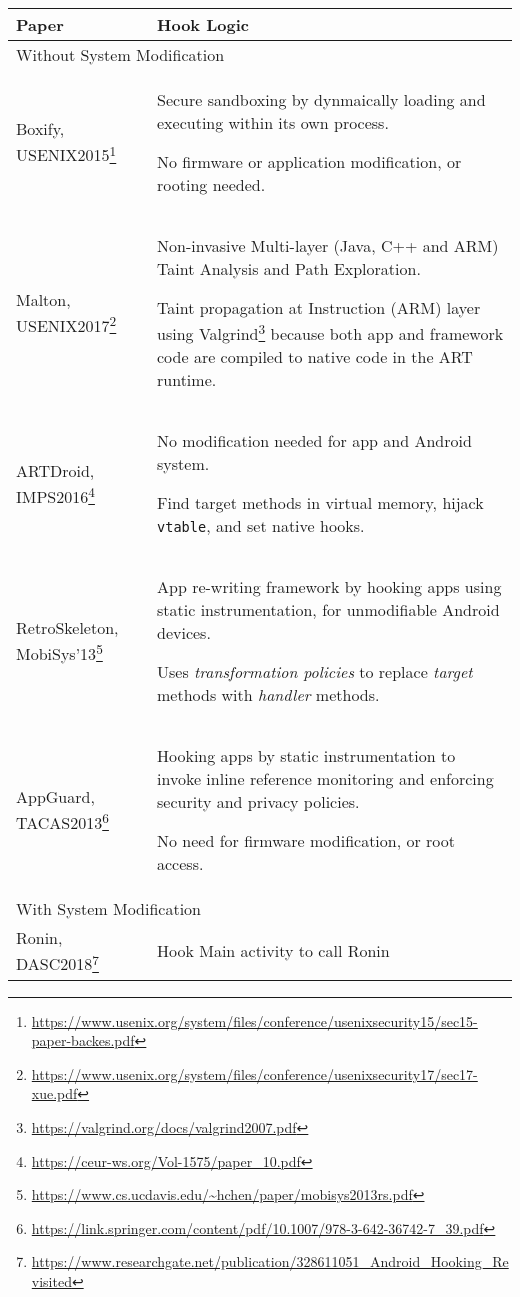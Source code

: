 \begin{longtable}{p{.3\linewidth}p{.7\linewidth}} 
\toprule
Paper & Hook Logic  \\
\midrule
\endhead
\multicolumn{2}{l}{Without System Modification}\\
\midrule

Boxify, USENIX2015\footnote{\url{https://www.usenix.org/system/files/conference/usenixsecurity15/sec15-paper-backes.pdf}}
& Secure sandboxing by dynmaically loading and executing within its own process.

No firmware or application modification, or rooting needed.
\\

Malton, USENIX2017\footnote{\url{https://www.usenix.org/system/files/conference/usenixsecurity17/sec17-xue.pdf}}
& Non-invasive Multi-layer (Java, C++ and ARM) Taint Analysis and Path Exploration. 

Taint propagation at Instruction (ARM) layer using Valgrind\footnote{\url{https://valgrind.org/docs/valgrind2007.pdf}} because both app and framework code are compiled to native code in the ART runtime.
\\

ARTDroid, IMPS2016\footnote{\url{https://ceur-ws.org/Vol-1575/paper_10.pdf}}
& No modification needed for app and Android system.

Find target methods in virtual memory, hijack \texttt{vtable}, and set native hooks.
\\

RetroSkeleton, MobiSys'13\footnote{\url{https://www.cs.ucdavis.edu/~hchen/paper/mobisys2013rs.pdf}}
& App re-writing framework by hooking apps using static instrumentation, for unmodifiable Android devices.

Uses \textit{transformation policies} to replace \textit{target} methods with \textit{handler} methods.
\\

AppGuard, TACAS2013\footnote{\url{https://link.springer.com/content/pdf/10.1007/978-3-642-36742-7_39.pdf}}
& Hooking apps by static instrumentation to invoke inline reference monitoring and enforcing security and privacy policies.

No need for firmware modification, or root access.
\\

\midrule
\multicolumn{2}{l}{With System Modification}\\
\midrule

Ronin, DASC2018\footnote{\url{https://www.researchgate.net/publication/328611051_Android_Hooking_Revisited}}
&Hook Main activity to call Ronin


\end{longtable}
